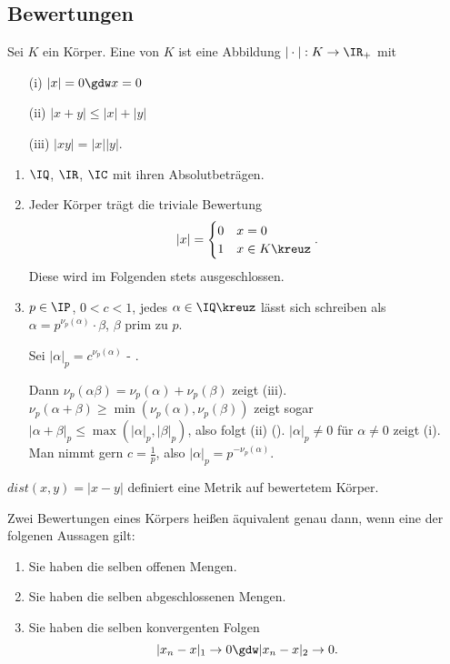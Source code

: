 \subsection{Bewertungen}

\begin{Definition}
 Sei $K$ ein Körper. Eine  von $K$ ist eine Abbildung
 $|\cdot|: K\rightarrow \IR_+$ mit 
 \begin{enumerate}
  \item[(i)] $|x|=0 \gdw x=0$
  \item[(ii)] $|x+y|\leq |x|+|y|$
  \item[(iii)] $|xy|=|x||y|$.
 \end{enumerate}
\end{Definition}

\begin{Beispiel}
 \begin{enumerate}
  \item $\IQ$, $\IR$, $\IC$ mit ihren Absolutbeträgen.
  \item Jeder Körper trägt die triviale Bewertung
  \[ 
    |x|=\begin{cases}
         0 & x=0\\
         1 & x\in K\kreuz
        \end{cases}.
  \]
  Diese wird im Folgenden stets ausgeschlossen.
  \item $p\in\IP$, $0<c<1$, jedes $\alpha\in\IQ\kreuz$ lässt sich schreiben als $\alpha=p^{\nu_p(\alpha)}\cdot \beta$, $\beta$ prim zu $p$.
  
  Sei $|\alpha|_p=c^{\nu_p(\alpha)}$ - .
  
  Dann $\nu_p(\alpha\beta)=\nu_p(\alpha)+\nu_p(\beta)$ zeigt (iii). $\nu_p(\alpha+\beta)\geq \min(\nu_p(\alpha),\nu_p(\beta))$ zeigt sogar $|\alpha+\beta|_p\leq \max(|\alpha|_p,|\beta|_p)$, also folgt (ii) (). $|\alpha|_p\neq 0$ für $\alpha\neq 0$ zeigt (i). Man nimmt gern $c=\frac{1}{p}$, also $|\alpha|_p=p^{-\nu_p(\alpha)}$.
 \end{enumerate}
\end{Beispiel}

\begin{Bemerkung}
 $dist(x,y)=|x-y|$ definiert eine Metrik auf bewertetem Körper.
\end{Bemerkung}

\begin{Definition}
 Zwei Bewertungen eines Körpers heißen äquivalent genau dann, wenn eine der folgenen Aussagen gilt:
 \begin{enumerate}
  \item Sie haben die selben offenen Mengen.
  \item Sie haben die selben abgeschlossenen Mengen.
  \item Sie haben die selben konvergenten Folgen \[|x_n-x|_1\rightarrow 0 \gdw |x_n-x|_2 \rightarrow 0. \]
 \end{enumerate}
\end{Definition}

